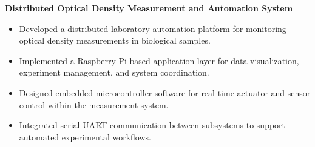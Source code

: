 \textbf{Distributed Optical Density Measurement and Automation System}
\begin{itemize}
  \item Developed a distributed laboratory automation platform for monitoring optical density measurements in biological samples.
  \item Implemented a Raspberry Pi-based application layer for data visualization, experiment management, and system coordination.
  \item Designed embedded microcontroller software for real-time actuator and sensor control within the measurement system.
  \item Integrated serial UART communication between subsystems to support automated experimental workflows.
\end{itemize}